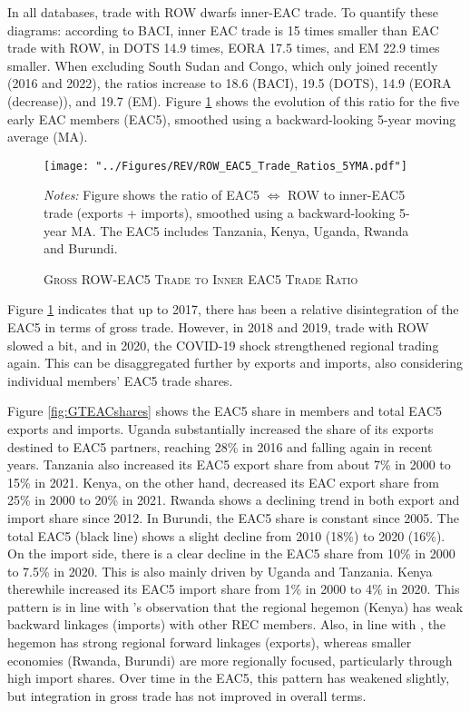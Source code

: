\documentclass[a4paper]{article}
\begin{document}
In all databases, trade with ROW dwarfs inner-EAC trade. To quantify these diagrams: according to BACI, inner EAC trade is 15 times smaller than EAC trade with ROW, in DOTS 14.9 times, EORA 17.5 times, and EM 22.9 times smaller. When excluding South Sudan and Congo, which only joined recently (2016 and 2022), the ratios increase to 18.6 (BACI), 19.5 (DOTS), 14.9 (EORA (decrease)), and 19.7 (EM). Figure \ref{fig:EAC_ROW_Ratios} shows the evolution of this ratio for the five early EAC members (EAC5), smoothed using a backward-looking 5-year moving average (MA). 

\begin{figure}[h!] \vspace{-2mm}
\centering
\caption{\label{fig:EAC_ROW_Ratios} \textsc{Gross ROW-EAC5 Trade to Inner EAC5 Trade Ratio}}
\vspace{2mm}
\texttt{[image: "../Figures/REV/ROW\_EAC5\_Trade\_Ratios\_5YMA.pdf"]} \\
\raggedright
\scriptsize 
\emph{Notes:} Figure shows the ratio of EAC5 $\Leftrightarrow$ ROW to inner-EAC5 trade (exports + imports), smoothed using a backward-looking 5-year MA. The EAC5 includes Tanzania, Kenya, Uganda, Rwanda and Burundi.
\vspace{-10mm}
\end{figure}
\FloatBarrier

Figure \ref{fig:EAC_ROW_Ratios} indicates that up to 2017, there has been a relative disintegration of the EAC5 in terms of gross trade. However, in 2018 and 2019, trade with ROW slowed a bit, and in 2020, the COVID-19 shock strengthened regional trading again. This can be disaggregated further by exports and imports, also considering individual members' EAC5 trade shares. \newline 

Figure \ref{fig:GTEACshares} shows the EAC5 share in members and total EAC5 exports and imports. %
Uganda substantially increased the share of its exports destined to EAC5 partners, reaching 28\% in 2016 and falling again in recent years. Tanzania also increased its EAC5 export share from about 7\% in 2000 to 15\% in 2021. Kenya, on the other hand, decreased its EAC export share from 25\% in 2000 to 20\% in 2021. Rwanda shows a declining trend in both export and import share since 2012. In Burundi, the EAC5 share is constant since 2005. The total EAC5 (black line) shows a slight decline from 2010 (18\%) to 2020 (16\%). On the import side, there is a clear decline in the EAC5 share from 10\% in 2000 to 7.5\% in 2020. This is also mainly driven by Uganda and Tanzania. Kenya therewhile increased its EAC5 import share from 1\% in 2000 to 4\% in 2020. This pattern is in line with \citet{obasaju2021regional}'s observation that the regional hegemon (Kenya) has weak backward linkages (imports) with other REC members. Also, in line with \citet{engel2016sacu}, the hegemon has strong regional forward linkages (exports), whereas smaller economies (Rwanda, Burundi) are more regionally focused, particularly through high import shares. Over time in the EAC5, this pattern has weakened slightly, but integration in gross trade has not improved in overall terms. 
\end{document}
